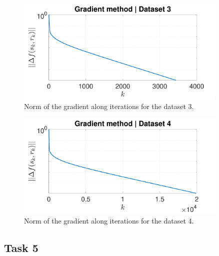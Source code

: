 \documentclass[12pt]{article}
\begin{document}
\begin{figure}[ht!]
    \centering
    \includegraphics[width=0.9\textwidth]{figures/GDNormGradDataset3.pdf}
    \caption{Norm of the gradient along iterations for the dataset 3.}
    \label{fig:GD_norm_dataset3}
\end{figure}

\begin{figure}[ht!]
    \centering
    \includegraphics[width=0.9\textwidth]{figures/GDNormGradDataset4.pdf}
    \caption{Norm of the gradient along iterations for the dataset 4.}
    \label{fig:GD_norm_dataset4}
\end{figure}

\subsection{Task 5}
\end{document}
